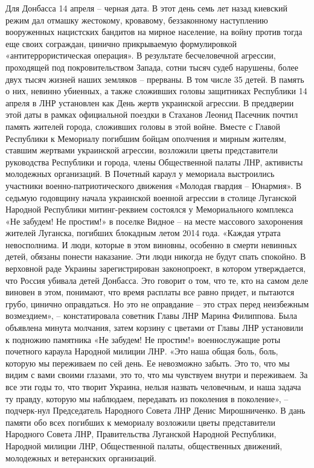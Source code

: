 Для Донбасса 14 апреля – черная дата. В этот день семь лет назад киевский режим дал отмашку жестокому, кровавому, беззаконному наступлению вооруженных нацистских бандитов на мирное население, на войну против тогда еще своих сограждан, цинично прикрываемую формулировкой «антитеррористическая операция». В результате бесчеловечной агрессии, проходящей под покровительством Запада, сотни тысяч судеб нарушены, более двух тысяч жизней наших земляков – прерваны. В том числе 35 детей.
В память о них, невинно убиенных, а также сложивших головы защитниках Республики 14 апреля в ЛНР установлен как День жертв украинской агрессии. В преддверии этой даты в рамках официальной поездки в Стаханов Леонид Пасечник почтил память жителей города, сложивших головы в этой войне. Вместе с Главой Республики к Мемориалу погибшим бойцам ополчения и мирным жителям, ставшим жертвами украинской агрессии, возложили цветы представители руководства Республики и города, члены Общественной палаты ЛНР, активисты молодежных организаций. В Почетный караул у мемориала выстроились участники военно-патриотического движения «Молодая гвардия – Юнармия».
В седьмую годовщину начала украинской военной агрессии в столице Луганской Народной Республики митинг-реквием состоялся у Мемориального комплекса «Не забудем! Не простим!» в поселке Видное – на месте массового захоронения жителей Луганска, погибших блокадным летом 2014 года. 
«Каждая утрата невосполнима. И люди, которые в этом виновны, особенно в смерти невинных детей, обязаны понести наказание. Эти люди никогда не будут спать спокойно. В верховной раде Украины зарегистрирован законопроект, в котором утверждается, что Россия убивала детей Донбасса. Это говорит о том, что те, кто на самом деле виновен в этом, понимают, что время расплаты все равно придет, и пытаются грубо, цинично оправдаться. Но это не оправдание – это страх перед неизбежным возмездием», – констатировала советник Главы ЛНР Марина Филиппова.
Была объявлена минута молчания, затем корзину с цветами от Главы ЛНР установили к подножию памятника «Не забудем! Не простим!» военнослужащие роты почетного караула Народной милиции ЛНР. 
«Это наша общая боль, боль, которую мы переживаем по сей день. Ее невозможно забыть. Это то, что мы видим с вами своими глазами, это то, что мы чувствуем внутри и переживаем. За все эти годы то, что творит Украина, нельзя назвать человечным, и наша задача ту правду, которую мы наблюдаем, передавать из поколения в поколение», – подчерк-нул Председатель Народного Совета ЛНР Денис Мирошниченко.
В дань памяти обо всех погибших к мемориалу возложили цветы представители Народного Совета ЛНР, Правительства Луганской Народной Республики, Народной милиции ЛНР, Общественной палаты, общественных движений, молодежных и ветеранских организаций.
